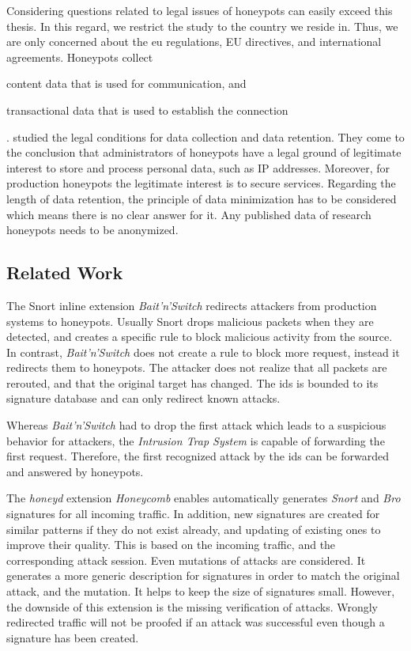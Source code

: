 Considering questions related to legal issues of honeypots can easily exceed this thesis.
In this regard, we restrict the study to the country we reside in.
Thus, we are only concerned about the \ac{eu} regulations, EU directives, and international agreements.
Honeypots collect
\begin{enumerate*}[label=(\roman*)]
    \item content data that is used for communication, and
    \item transactional data that is used to establish the connection
\end{enumerate*}.
\citet{sokol2017} studied the legal conditions for data collection and data retention. They come to the conclusion that administrators of honeypots have a legal ground of legitimate interest to store and process personal data, such as IP addresses. Moreover, for production honeypots the legitimate interest is to secure services. Regarding the length of data retention, the principle of data minimization has to be considered which means there is no clear answer for it. Any published data of research honeypots needs to be anonymized.

\subsection{Related Work}

The Snort \cite{caswell2003} inline extension \textit{Bait'n'Switch} \cite{gonzalez2003} redirects attackers from production systems to honeypots.
Usually Snort drops malicious packets when they are detected, and creates a specific rule to block malicious activity from the source.
In contrast, \textit{Bait'n'Switch} does not create a rule to block more request, instead it redirects them to honeypots.
The attacker does not realize that all packets are rerouted, and that the original target has changed.
The \ac{ids} is bounded to its signature database and can only redirect known attacks. \cite{Diebold2005}

Whereas \textit{Bait'n'Switch} had to drop the first attack which leads to a suspicious behavior for attackers, the \textit{Intrusion Trap System} \cite{takemori2003} is capable of forwarding the first request.
Therefore, the first recognized attack by the \ac{ids} can be forwarded and answered by honeypots. \cite{Diebold2005}

The \textit{honeyd} \cite{Provos2003} extension \textit{Honeycomb} \cite{kreibich2004} enables automatically generates \textit{Snort} and \textit{Bro} \cite{paxson1999} signatures for all incoming traffic.
In addition, new signatures are created for similar patterns if they do not exist already, and updating of existing ones to improve their quality.
This is based on the incoming traffic, and the corresponding attack session.
Even mutations of attacks are considered.
It generates a more generic description for signatures in order to match the original attack, and the mutation.
It helps to keep the size of signatures small.
However, the downside of this extension is the missing verification of attacks.
Wrongly redirected traffic will not be proofed if an attack was successful even though a signature has been created. \cite{Diebold2005}
